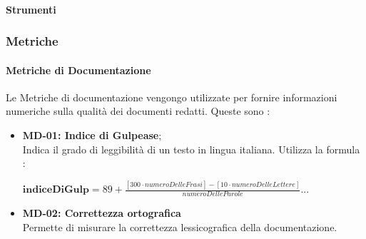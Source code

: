 			\paragraph{Strumenti} \hfill \break
			
		\subsubsection{Metriche} \hfill \break
				
			\paragraph{Metriche di Documentazione} \hfill \break
			Le Metriche di documentazione vengongo utilizzate per fornire informazioni numeriche sulla qualità dei documenti redatti.  Queste sono :
			\begin{itemize}
				\item \textbf{MD-01: Indice di Gulpease}; \\ Indica il grado di leggibilità di un testo in lingua italiana. Utilizza la formula : \\
				\begin{center}
					$ \textbf{indiceDiGulp} = 89 + \frac{ [300 \cdot numeroDelleFrasi] - [10 \cdot numeroDelleLettere]}{numeroDelleParole}$...
				\end{center}
					
				\item \textbf{MD-02: Correttezza ortografica} \\ Permette di misurare la correttezza lessicografica della documentazione.\\
			\end{itemize}			
		
